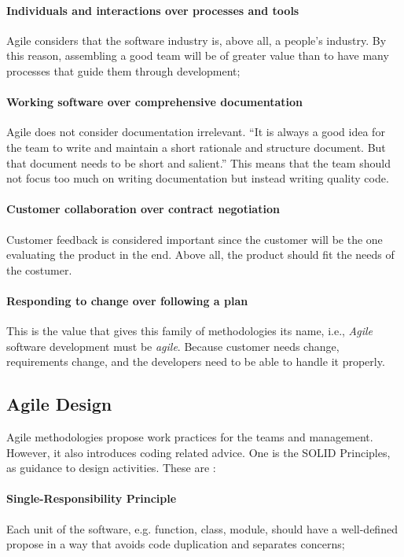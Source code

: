 \documentclass[conference]{IEEEtran}
\begin{document}
\paragraph{Individuals and interactions over processes and tools} Agile considers that the software industry is, above all, a people's industry. By this reason, assembling a good team will be of greater value than to have many processes that guide them through development;
\paragraph{Working software over comprehensive documentation} Agile does not consider documentation irrelevant. ``It is always a good idea for the team to write and maintain a short rationale and structure document. But that document needs to be short and salient.''\cite{Martin:2006vx} This means that the team should not focus too much on writing documentation but instead writing quality code.
\paragraph{Customer collaboration over contract negotiation} Customer feedback is considered important since the customer will be the one evaluating the product in the end. Above all, the product should fit the needs of the costumer.
\paragraph{Responding to change over following a plan} This is the value that gives this family of methodologies its name, i.e., \textit{Agile} software development must be \textit{agile}. Because customer needs change, requirements change, and the developers need to be able to handle it properly.

\subsection{Agile Design}
Agile methodologies propose work practices for the teams and management. However, it also introduces coding related advice. One is the SOLID Principles, as guidance to design activities. These are \cite{Martin:2006vx}\cite{Martin:2009uy}:
\paragraph{Single-Responsibility Principle} Each unit of the software, e.g. function, class, module, should have a well-defined propose in a way that avoids code duplication and separates concerns;
\end{document}
